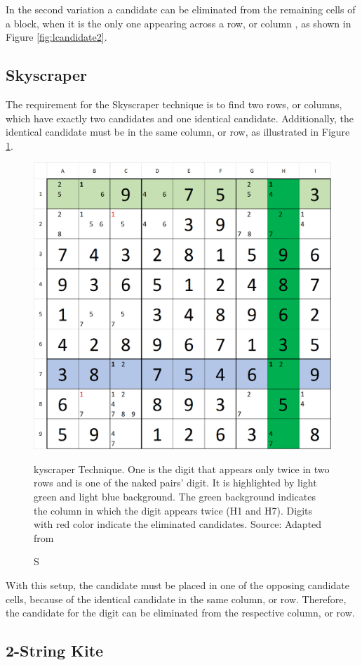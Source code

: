\documentclass[twoside]{ausarbeitung}
\begin{document}
In the second variation a candidate can be eliminated from the remaining cells of a block, when it is the only one appearing across  a row, or column \cite{SolvingS57:online}, as shown in Figure \ref{fig:lcandidate2}.


\subsection{Skyscraper} \label{ss:sky}
The requirement for the Skyscraper technique is to find two rows, or columns, which have exactly two candidates and one identical candidate. Additionally, the identical candidate must be in the same column, or row, as illustrated in Figure \ref{fig:skyscraper}.

\begin{figure}[H]
  \centering
  \includegraphics[width=.55\linewidth]{images/skyscraper}
  \caption[Skyscraper] Skyscraper Technique. One is the digit that appears only twice in two rows and is one of the naked pairs' digit. It is highlighted by light green and light blue background. The green background indicates the column in which the digit appears twice (H1 and H7). Digits with red color indicate the eliminated candidates. Source: Adapted from \cite{SudokuSk81:online}
  \label{fig:skyscraper}
\end{figure}%

With this setup, the candidate must be placed in one of the opposing candidate cells, because of the identical candidate in the same column, or row. Therefore, the candidate for the digit can be eliminated from the respective column, or row.
\cite{SudokuSk81:online}


\subsection{2-String Kite}
\end{document}
